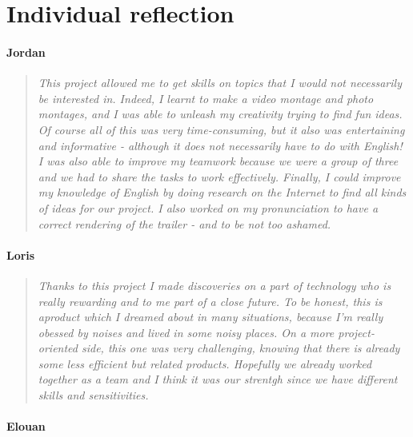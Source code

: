 \documentclass[12pt, a4paper]{article}
\begin{document}
    \selectfont

    \section{Individual reflection}

    \paragraph{Jordan}

    \begin{quotation}
    \emph{This project allowed me to get skills on topics that I would not necessarily be interested in.
    Indeed, I learnt to make a video montage and photo montages, and I was able to unleash my creativity trying to find fun ideas. Of course all of this was very time-consuming, but it also was entertaining and informative - although it does not necessarily have to do with English!
    I was also able to improve my teamwork because we were a group of three and we had to share the tasks to work effectively.
    Finally, I could improve my knowledge of English by doing research on the Internet to find all kinds of ideas for our project. I also worked on my pronunciation to have a correct rendering of the trailer - and to be not too ashamed.}
    \end{quotation}

    \paragraph{Loris}

    \begin{quotation}
    \emph{Thanks to this project I made discoveries on a part of technology who is really rewarding and to me part of a close future. To be honest, this is aproduct which I dreamed about in many situations, because I'm really obessed by noises and lived in some noisy places. On a more project-oriented side, this one was very challenging, knowing that there is already some less efficient but related products. Hopefully we already worked together as a team and I think it was our strentgh since we have different skills and sensitivities.}
    \end{quotation}

    \paragraph{Elouan}
\end{document}
